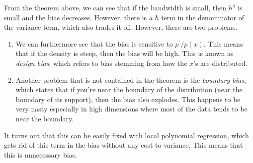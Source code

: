   From the theorem above, we can see that if the bandwidth is small, then $h^4$ is small and the bias decreases. However, there is a $h$ term in the denominator of the variance term, which also trades it off. However, there are two problems. 
  \begin{enumerate}
    \item We can furthermore see that the bias is sensitive to $p^\prime / p(x)$. This means that if the density is steep, then the bias will be high. This is known as \textit{design bias}, which refers to bias stemming from how the $x$'s are distributed. 
    \item Another problem that is not contained in the theorem is the \textit{boundary bias}, which states that if you're near the boundary of the distribution (near the boundary of its support), then the bias also explodes. This happens to be very nasty especially in high dimensions where most of the data tends to be near the boundary.
  \end{enumerate}

  It turns out that this can be easily fixed with local polynomial regression, which gets rid of this term in the bias without any cost to variance. This means that this is unnecessary bias. 
